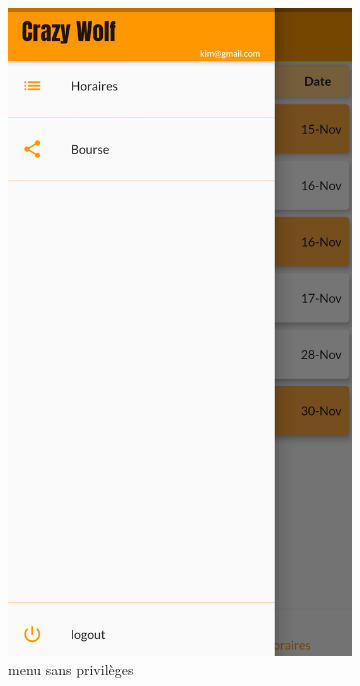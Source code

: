 \begin{figure}[!h]
\begin{subfigure}{.3\textwidth}
        \includegraphics[width=0.9\linewidth]{screenshots/scenario_02/menu_serveur_normal.png}
        \caption{menu sans privilèges}
        \label{fig:menu_sans_droits}
    \end{subfigure}
    \begin{subfigure}{.3\textwidth}
        \centering

\end{subfigure}
\end{figure}
